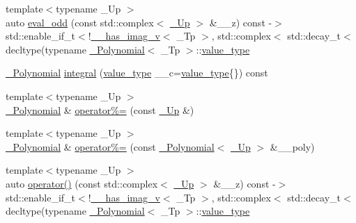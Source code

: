 \begin{DoxyCompactItemize}
\item 
{\footnotesize template$<$typename \+\_\+\+Up $>$ }\\auto \hyperlink{class____gnu__cxx_1_1__Polynomial_a5348bf4c4db826660a133ab731f775c1}{eval\+\_\+odd} (const std\+::complex$<$ \hyperlink{class____gnu__cxx_1_1__Polynomial_a242114d4b86648a5dff67a8221f80d40}{\+\_\+\+Up} $>$ \&\+\_\+\+\_\+z) const -\/$>$ std\+::enable\+\_\+if\+\_\+t$<$!\hyperlink{namespace____gnu__cxx_afa2404a914b06f950f3a46e75aca51a9}{\+\_\+\+\_\+has\+\_\+imag\+\_\+v}$<$ \+\_\+\+Tp $>$, std\+::complex$<$ std\+::decay\+\_\+t$<$ decltype(typename \hyperlink{class____gnu__cxx_1_1__Polynomial}{\+\_\+\+Polynomial}$<$ \+\_\+\+Tp $>$\+::\hyperlink{class____gnu__cxx_1_1__Polynomial_a725563351f50e76084a7a016c06f8a53}{value\+\_\+type}
\item 
\hyperlink{class____gnu__cxx_1_1__Polynomial}{\+\_\+\+Polynomial} \hyperlink{class____gnu__cxx_1_1__Polynomial_a4f9871fb66fc6075767f1db61a323fd0}{integral} (\hyperlink{class____gnu__cxx_1_1__Polynomial_a725563351f50e76084a7a016c06f8a53}{value\+\_\+type} \+\_\+\+\_\+c=\hyperlink{class____gnu__cxx_1_1__Polynomial_a725563351f50e76084a7a016c06f8a53}{value\+\_\+type}\{\}) const
\item 
{\footnotesize template$<$typename \+\_\+\+Up $>$ }\\\hyperlink{class____gnu__cxx_1_1__Polynomial}{\+\_\+\+Polynomial} \& \hyperlink{class____gnu__cxx_1_1__Polynomial_ade8196c94c8e169f00730730d0c6b99e}{operator\%=} (const \hyperlink{class____gnu__cxx_1_1__Polynomial_a242114d4b86648a5dff67a8221f80d40}{\+\_\+\+Up} \&)
\item 
{\footnotesize template$<$typename \+\_\+\+Up $>$ }\\\hyperlink{class____gnu__cxx_1_1__Polynomial}{\+\_\+\+Polynomial} \& \hyperlink{class____gnu__cxx_1_1__Polynomial_a66661e25c272a310f7bf1abbcc8fa2a9}{operator\%=} (const \hyperlink{class____gnu__cxx_1_1__Polynomial}{\+\_\+\+Polynomial}$<$ \hyperlink{class____gnu__cxx_1_1__Polynomial_a242114d4b86648a5dff67a8221f80d40}{\+\_\+\+Up} $>$ \&\+\_\+\+\_\+poly)
\item 
{\footnotesize template$<$typename \+\_\+\+Up $>$ }\\auto \hyperlink{class____gnu__cxx_1_1__Polynomial_af744b14b94fd7dbb579b8902b8609258}{operator()} (const std\+::complex$<$ \hyperlink{class____gnu__cxx_1_1__Polynomial_a242114d4b86648a5dff67a8221f80d40}{\+\_\+\+Up} $>$ \&\+\_\+\+\_\+z) const -\/$>$ std\+::enable\+\_\+if\+\_\+t$<$!\hyperlink{namespace____gnu__cxx_afa2404a914b06f950f3a46e75aca51a9}{\+\_\+\+\_\+has\+\_\+imag\+\_\+v}$<$ \+\_\+\+Tp $>$, std\+::complex$<$ std\+::decay\+\_\+t$<$ decltype(typename \hyperlink{class____gnu__cxx_1_1__Polynomial}{\+\_\+\+Polynomial}$<$ \+\_\+\+Tp $>$\+::\hyperlink{class____gnu__cxx_1_1__Polynomial_a725563351f50e76084a7a016c06f8a53}{value\+\_\+type}

\end{DoxyCompactItemize}
